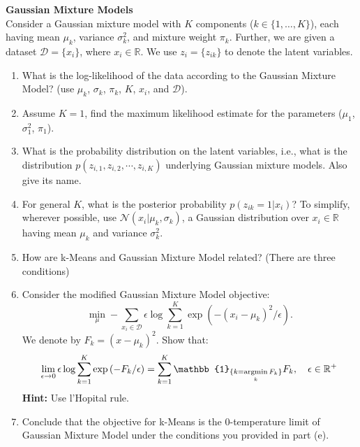 \begin{Q}
\textbf{\Large Gaussian Mixture Models}\\

Consider a Gaussian mixture model with $K$ components ($k\in\{1, \ldots, K\}$), each having mean $\mu_k$, variance $\sigma_k^2$, and mixture weight $\pi_k$. Further, we are given a dataset $\mathcal{D} = \{x_i\}$, where $x_i \in \mathbb{R}$. We use $z_{i} = \{z_{ik}\}$ to denote the latent variables.


\begin{enumerate}

\item What is the log-likelihood of the data according to the Gaussian Mixture Model? (use $\mu_k$, $\sigma_k$, $\pi_k$, $K$, $x_i$, and $\mathcal{D}$).

\item Assume $K=1$,  find the maximum likelihood estimate for the parameters ($\mu_{1}$, $\sigma_{1}^{2}$, $\pi_{1}$).

\item What is the probability distribution on the latent variables, i.e., what is the distribution
$p(z_{i,1}, z_{i,2}, \cdots, z_{i,K} )$ underlying Gaussian mixture models. Also give its name.


\item For general $K$, what is the posterior probability $p(z_{ik} = 1|x_i)$? To simplify, wherever possible, use $\mathcal{N}(x_{i}|\mu_{k},\sigma_{k})$, a Gaussian distribution over $x_{i} \in \mathbb{R}$ having mean $\mu_{k}$ and variance $\sigma_{k}^2$.


\item  How are k-Means and Gaussian Mixture Model related? (There are three conditions)

\item Consider the modified Gaussian Mixture Model objective:
$$
\min_{\mu} - \sum_{x_{i} \in \mathcal{D}} \epsilon \log \sum_{k=1}^{K} \exp{(-(x_{i} - \mu_{k} )^{2}/\epsilon) }.
$$
We denote by $F_{k}= (x-\mu_{k})^{2}$. Show that:
$$
\lim_{\epsilon \rightarrow 0} \epsilon \log \sum_{k=1}^{K} \exp{(-F_{k}/\epsilon) } = \sum_{k=1}^{K}  \mathbb{1}_{\{k=\argmin\limits_{k} F_{k}  \}} F_{k}, \quad \epsilon \in \mathbb{R}^{+}
$$
\textbf{Hint:} Use l'Hopital rule.

\item Conclude that the objective for k-Means is the 0-temperature limit of Gaussian Mixture Model under the conditions you provided in part (e).


\end{enumerate}

\end{Q}
          